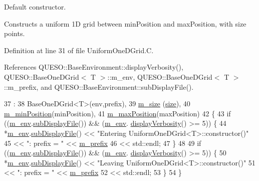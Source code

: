 Default constructor. 

Constructs a uniform 1\-D grid between {\ttfamily min\-Position} and {\ttfamily max\-Position}, with {\ttfamily size} points. 

Definition at line 31 of file Uniform\-One\-D\-Grid.\-C.



References Q\-U\-E\-S\-O\-::\-Base\-Environment\-::display\-Verbosity(), Q\-U\-E\-S\-O\-::\-Base\-One\-D\-Grid$<$ T $>$\-::m\-\_\-env, Q\-U\-E\-S\-O\-::\-Base\-One\-D\-Grid$<$ T $>$\-::m\-\_\-prefix, and Q\-U\-E\-S\-O\-::\-Base\-Environment\-::sub\-Display\-File().


\begin{DoxyCode}
37   :
38   BaseOneDGrid<T>(env,prefix),
39   \hyperlink{class_q_u_e_s_o_1_1_uniform_one_d_grid_a4d76f44ccd66199aa55fa75aed57ffaa}{m\_size}       (\hyperlink{class_q_u_e_s_o_1_1_uniform_one_d_grid_a66a0589eb7da47895f2bab97b916fca4}{size}),
40   \hyperlink{class_q_u_e_s_o_1_1_uniform_one_d_grid_a1cf3c2bcc5b0dd70ecf5addcae839a2b}{m\_minPosition}(minPosition),
41   \hyperlink{class_q_u_e_s_o_1_1_uniform_one_d_grid_ab65cb3991c8759837cdc0f3a5094a4c7}{m\_maxPosition}(maxPosition)
42 \{
43   \textcolor{keywordflow}{if} ((\hyperlink{class_q_u_e_s_o_1_1_base_one_d_grid_a668a0033829b907fac9e13466419b7b1}{m\_env}.\hyperlink{class_q_u_e_s_o_1_1_base_environment_a8a0064746ae8dddfece4229b9ad374d6}{subDisplayFile}()) && (\hyperlink{class_q_u_e_s_o_1_1_base_one_d_grid_a668a0033829b907fac9e13466419b7b1}{m\_env}.
      \hyperlink{class_q_u_e_s_o_1_1_base_environment_a1fe5f244fc0316a0ab3e37463f108b96}{displayVerbosity}() >= 5)) \{
44     *\hyperlink{class_q_u_e_s_o_1_1_base_one_d_grid_a668a0033829b907fac9e13466419b7b1}{m\_env}.\hyperlink{class_q_u_e_s_o_1_1_base_environment_a8a0064746ae8dddfece4229b9ad374d6}{subDisplayFile}() << \textcolor{stringliteral}{"Entering UniformOneDGrid<T>::constructor()"}
45                            << \textcolor{stringliteral}{": prefix = "} << \hyperlink{class_q_u_e_s_o_1_1_base_one_d_grid_af5fa59e47fae9f6195b00e5bec8310f8}{m\_prefix}
46                            << std::endl;
47   \}
48 
49   \textcolor{keywordflow}{if} ((\hyperlink{class_q_u_e_s_o_1_1_base_one_d_grid_a668a0033829b907fac9e13466419b7b1}{m\_env}.\hyperlink{class_q_u_e_s_o_1_1_base_environment_a8a0064746ae8dddfece4229b9ad374d6}{subDisplayFile}()) && (\hyperlink{class_q_u_e_s_o_1_1_base_one_d_grid_a668a0033829b907fac9e13466419b7b1}{m\_env}.
      \hyperlink{class_q_u_e_s_o_1_1_base_environment_a1fe5f244fc0316a0ab3e37463f108b96}{displayVerbosity}() >= 5)) \{
50     *\hyperlink{class_q_u_e_s_o_1_1_base_one_d_grid_a668a0033829b907fac9e13466419b7b1}{m\_env}.\hyperlink{class_q_u_e_s_o_1_1_base_environment_a8a0064746ae8dddfece4229b9ad374d6}{subDisplayFile}() << \textcolor{stringliteral}{"Leaving UniformOneDGrid<T>::constructor()"}
51                            << \textcolor{stringliteral}{": prefix = "} << \hyperlink{class_q_u_e_s_o_1_1_base_one_d_grid_af5fa59e47fae9f6195b00e5bec8310f8}{m\_prefix}
52                            << std::endl;
53   \}
54 \}
\end{DoxyCode}
